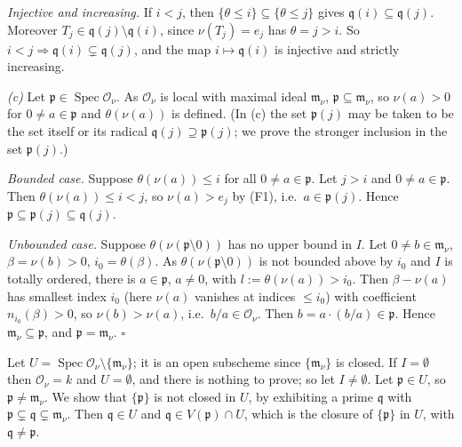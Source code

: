 \documentclass[11pt]{article}
\begin{document}
\emph{Injective and increasing.} If $i<j$, then $\{\theta\le i\}\subseteq\{\theta\le j\}$ gives $\mathfrak q(i)\subseteq\mathfrak q(j)$. Moreover $T_j\in\mathfrak q(j)\setminus\mathfrak q(i)$, since $\nu(T_j)=e_j$ has $\theta=j>i$. So $i<j\Rightarrow\mathfrak q(i)\subsetneq\mathfrak q(j)$, and the map $i\mapsto\mathfrak q(i)$ is injective and strictly increasing.

\emph{(c)} Let $\mathfrak p\in\operatorname{Spec}\mathcal{O}_\nu$. As $\mathcal{O}_\nu$ is local with maximal ideal $\mathfrak m_\nu$, $\mathfrak p\subseteq\mathfrak m_\nu$, so $\nu(a)>0$ for $0\neq a\in\mathfrak p$ and $\theta(\nu(a))$ is defined. (In (c) the set $\mathfrak p(j)$ may be taken to be the set itself or its radical $\mathfrak q(j)\supseteq\mathfrak p(j)$; we prove the stronger inclusion in the set $\mathfrak p(j)$.)

\emph{Bounded case.} Suppose $\theta(\nu(a))\le i$ for all $0\neq a\in\mathfrak p$. Let $j>i$ and $0\neq a\in\mathfrak p$. Then $\theta(\nu(a))\le i<j$, so $\nu(a)>e_j$ by (F1), i.e.\ $a\in\mathfrak p(j)$. Hence $\mathfrak p\subseteq\mathfrak p(j)\subseteq\mathfrak q(j)$.

\emph{Unbounded case.} Suppose $\theta(\nu(\mathfrak p\setminus0))$ has no upper bound in $I$. Let $0\neq b\in\mathfrak m_\nu$, $\beta=\nu(b)>0$, $i_0=\theta(\beta)$. As $\theta(\nu(\mathfrak p\setminus0))$ is not bounded above by $i_0$ and $I$ is totally ordered, there is $a\in\mathfrak p$, $a\ne 0$, with $l:=\theta(\nu(a))>i_0$. Then $\beta-\nu(a)$ has smallest index $i_0$ (here $\nu(a)$ vanishes at indices $\le i_0$) with coefficient $n_{i_0}(\beta)>0$, so $\nu(b)>\nu(a)$, i.e.\ $b/a\in\mathcal{O}_\nu$. Then $b=a\cdot(b/a)\in\mathfrak p$. Hence $\mathfrak m_\nu\subseteq\mathfrak p$, and $\mathfrak p=\mathfrak m_\nu$. \hfill$\square$

\pf
Let $U=\operatorname{Spec}\mathcal{O}_\nu\setminus\{\mathfrak m_\nu\}$; it is an open subscheme since $\{\mathfrak m_\nu\}$ is closed. If $I=\emptyset$ then $\mathcal{O}_\nu=k$ and $U=\emptyset$, and there is nothing to prove; so let $I\neq\emptyset$. Let $\mathfrak p\in U$, so $\mathfrak p\neq\mathfrak m_\nu$. We show that $\{\mathfrak p\}$ is not closed in $U$, by exhibiting a prime $\mathfrak q$ with $\mathfrak p\subsetneq\mathfrak q\subsetneq\mathfrak m_\nu$. Then $\mathfrak q\in U$ and $\mathfrak q\in V(\mathfrak p)\cap U$, which is the closure of $\{\mathfrak p\}$ in $U$, with $\mathfrak q\neq\mathfrak p$.
\end{document}
